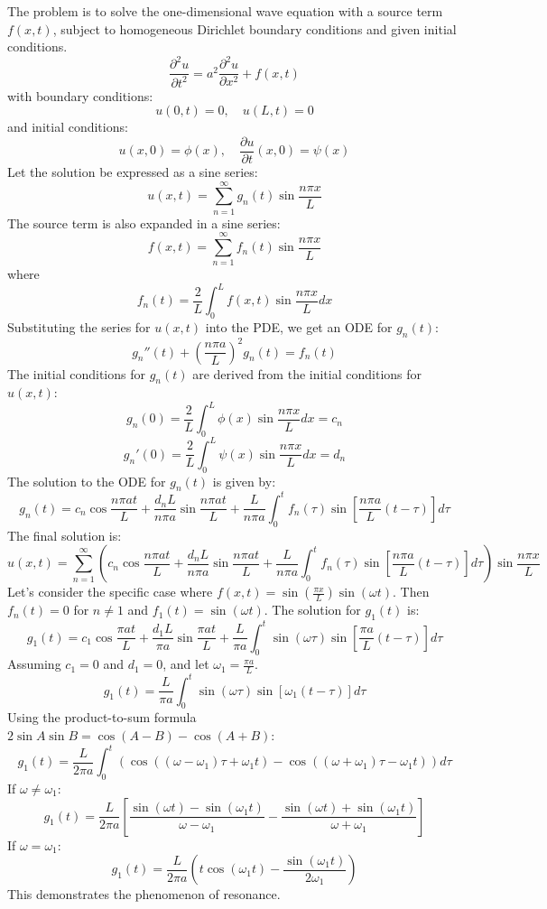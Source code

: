 \documentclass{article}
\begin{document}
	The problem is to solve the one-dimensional wave equation with a source term $f(x, t)$, subject to homogeneous Dirichlet boundary conditions and given initial conditions.
	$$
	\frac{\partial^2 u}{\partial t^2} = a^2 \frac{\partial^2 u}{\partial x^2} + f(x, t)
	$$
	with boundary conditions:
	$$
	u(0, t) = 0, \quad u(L, t) = 0
	$$
	and initial conditions:
	$$
	u(x, 0) = \phi(x), \quad \frac{\partial u}{\partial t}(x, 0) = \psi(x)
	$$
	Let the solution be expressed as a sine series:
	$$
	u(x, t) = \sum_{n=1}^{\infty} g_n(t) \sin\frac{n\pi x}{L}
	$$
	The source term is also expanded in a sine series:
	$$
	f(x, t) = \sum_{n=1}^{\infty} f_n(t) \sin\frac{n\pi x}{L}
	$$
	where
	$$
	f_n(t) = \frac{2}{L} \int_0^L f(x, t) \sin\frac{n\pi x}{L} dx
	$$
	Substituting the series for $u(x,t)$ into the PDE, we get an ODE for $g_n(t)$:
	$$
	g_n''(t) + \left(\frac{n\pi a}{L}\right)^2 g_n(t) = f_n(t)
	$$
	The initial conditions for $g_n(t)$ are derived from the initial conditions for $u(x,t)$:
	$$
	g_n(0) = \frac{2}{L} \int_0^L \phi(x) \sin\frac{n\pi x}{L} dx = c_n
	$$
	$$
	g_n'(0) = \frac{2}{L} \int_0^L \psi(x) \sin\frac{n\pi x}{L} dx = d_n
	$$
	The solution to the ODE for $g_n(t)$ is given by:
	$$
	g_n(t) = c_n \cos\frac{n\pi a t}{L} + \frac{d_n L}{n\pi a} \sin\frac{n\pi a t}{L} + \frac{L}{n\pi a} \int_0^t f_n(\tau) \sin\left[\frac{n\pi a}{L}(t-\tau)\right] d\tau
	$$
	The final solution is:
	$$
	u(x, t) = \sum_{n=1}^{\infty} \left( c_n \cos\frac{n\pi a t}{L} + \frac{d_n L}{n\pi a} \sin\frac{n\pi a t}{L} + \frac{L}{n\pi a} \int_0^t f_n(\tau) \sin\left[\frac{n\pi a}{L}(t-\tau)\right] d\tau \right) \sin\frac{n\pi x}{L}
	$$
	Let's consider the specific case where $f(x,t) = \sin(\frac{\pi x}{L})\sin(\omega t)$.
	Then $f_n(t) = 0$ for $n \neq 1$ and $f_1(t) = \sin(\omega t)$.
	The solution for $g_1(t)$ is:
	$$
	g_1(t) = c_1 \cos\frac{\pi a t}{L} + \frac{d_1 L}{\pi a} \sin\frac{\pi a t}{L} + \frac{L}{\pi a} \int_0^t \sin(\omega\tau) \sin\left[\frac{\pi a}{L}(t-\tau)\right] d\tau
	$$
	Assuming $c_1=0$ and $d_1=0$, and let $\omega_1 = \frac{\pi a}{L}$.
	$$
	g_1(t) = \frac{L}{\pi a} \int_0^t \sin(\omega\tau) \sin[\omega_1(t-\tau)] d\tau
	$$
	Using the product-to-sum formula $2\sin A \sin B = \cos(A-B) - \cos(A+B)$:
	$$
	g_1(t) = \frac{L}{2\pi a} \int_0^t \left( \cos((\omega-\omega_1)\tau + \omega_1 t) - \cos((\omega+\omega_1)\tau - \omega_1 t) \right) d\tau
	$$
	If $\omega \neq \omega_1$:
	$$
	g_1(t) = \frac{L}{2\pi a} \left[ \frac{\sin(\omega t) - \sin(\omega_1 t)}{\omega - \omega_1} - \frac{\sin(\omega t) + \sin(\omega_1 t)}{\omega + \omega_1} \right]
	$$
	If $\omega = \omega_1$:
	$$
	g_1(t) = \frac{L}{2\pi a} \left( t \cos(\omega_1 t) - \frac{\sin(\omega_1 t)}{2\omega_1} \right)
	$$
	This demonstrates the phenomenon of resonance.
	
\end{document}
